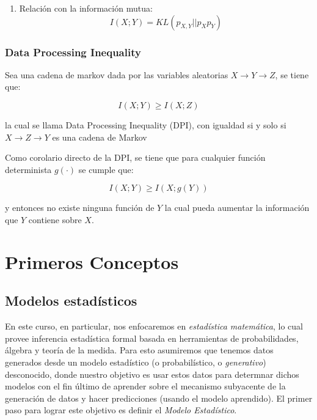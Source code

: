 \begin{prop}
\begin{enumerate}
    \item Relación con la información mutua:
    \[I(X;Y)=KL(p_{X,Y}||p_X p_Y)\]
\end{enumerate}
\end{prop}


\subsection{Data Processing Inequality}

\begin{theorem}
Sea una cadena de markov dada por las variables aleatorias $X\rightarrow Y\rightarrow Z$, se tiene que:

\[I(X;Y)\geq I(X;Z)\]

la cual se llama Data Processing Inequality (DPI), con igualdad si y solo si $X\rightarrow Z\rightarrow Y$ es una cadena de Markov
\end{theorem}

Como corolario directo de la DPI, se tiene que para cualquier función determinista $g(\cdot)$ se cumple que:

\[I(X;Y)\geq I(X;g(Y))\]

y entonces no existe ninguna función de $Y$ la cual pueda aumentar la información que $Y$ contiene sobre $X$.


 









\chapter{Primeros Conceptos}

\section{Modelos estadísticos}

En este curso, en particular, nos enfocaremos en  \emph{estadística matemática}, lo cual provee inferencia estadística formal basada en herramientas de probabilidades, álgebra y teoría de la medida. Para esto asumiremos que tenemos datos generados desde un modelo estadístico (o probabilístico, o \emph{generativo}) desconocido, donde nuestro objetivo es usar estos datos para determnar dichos modelos con el fin 
último de aprender sobre el mecanismo subyacente de la generación de datos y hacer predicciones (usando el modelo aprendido). El primer paso para lograr este objetivo es definir el \emph{Modelo Estadístico}.

